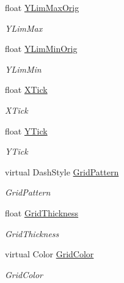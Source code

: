 \begin{DoxyCompactItemize}
float \mbox{\hyperlink{class_c_s_i_1_1_library_1_1_plotting_lib_1_1_chart_style_a6b775278417efadd501aacb8bfd19e93}{Y\+Lim\+Max\+Orig}}
\begin{DoxyCompactList}\small\item\em Y\+Lim\+Max \end{DoxyCompactList}\item 
float \mbox{\hyperlink{class_c_s_i_1_1_library_1_1_plotting_lib_1_1_chart_style_a206594eee2bb12efb3134be499384761}{Y\+Lim\+Min\+Orig}}
\begin{DoxyCompactList}\small\item\em Y\+Lim\+Min \end{DoxyCompactList}\item 
float \mbox{\hyperlink{class_c_s_i_1_1_library_1_1_plotting_lib_1_1_chart_style_a06ba65791424559756e81ad8d2a38119}{X\+Tick}}
\begin{DoxyCompactList}\small\item\em X\+Tick \end{DoxyCompactList}\item 
float \mbox{\hyperlink{class_c_s_i_1_1_library_1_1_plotting_lib_1_1_chart_style_a3f11da20564ccd605f5c26d4fd1eab61}{Y\+Tick}}
\begin{DoxyCompactList}\small\item\em Y\+Tick \end{DoxyCompactList}\item 
virtual Dash\+Style \mbox{\hyperlink{class_c_s_i_1_1_library_1_1_plotting_lib_1_1_chart_style_ad1048ed122e6d84fdd6700998b2e2a78}{Grid\+Pattern}}
\begin{DoxyCompactList}\small\item\em Grid\+Pattern \end{DoxyCompactList}\item 
float \mbox{\hyperlink{class_c_s_i_1_1_library_1_1_plotting_lib_1_1_chart_style_aff85fe164cd901e0b19cc02d1a7aa52e}{Grid\+Thickness}}
\begin{DoxyCompactList}\small\item\em Grid\+Thickness \end{DoxyCompactList}\item 
virtual Color \mbox{\hyperlink{class_c_s_i_1_1_library_1_1_plotting_lib_1_1_chart_style_a10d17a0767262c7b8c0353518a128ddf}{Grid\+Color}}
\begin{DoxyCompactList}\small\item\em Grid\+Color \end{DoxyCompactList}\end{DoxyCompactItemize}


